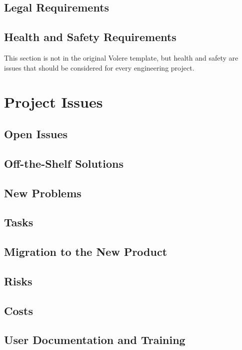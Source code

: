 \documentclass[12pt, titlepage]{article}
\begin{document}
\subsection{Legal Requirements}

\subsection{Health and Safety Requirements}

This section is not in the original Volere template, but health and safety are
issues that should be considered for every engineering project.

\section{Project Issues}

\subsection{Open Issues}

\subsection{Off-the-Shelf Solutions}

\subsection{New Problems}

\subsection{Tasks}

\subsection{Migration to the New Product}

\subsection{Risks}

\subsection{Costs}

\subsection{User Documentation and Training}
\end{document}
